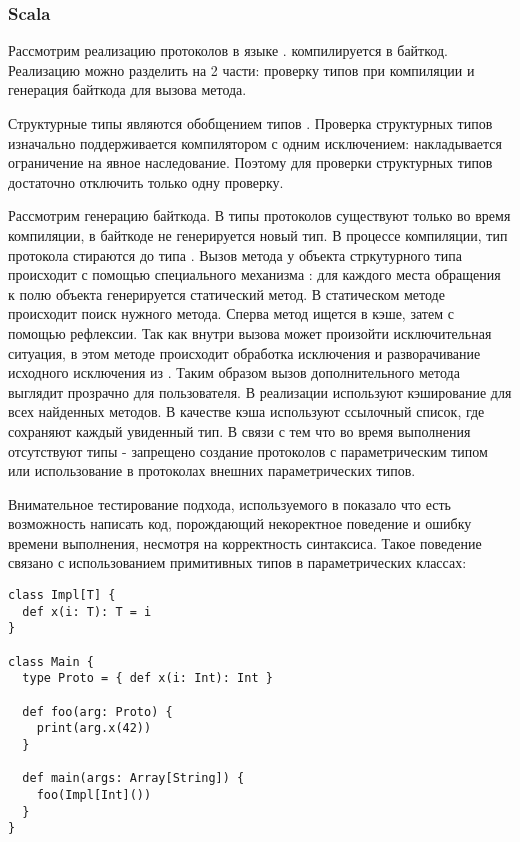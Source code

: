 \subsubsection{Scala}
Рассмотрим реализацию протоколов в языке \cite{scala:structural}.  компилируется в  байткод. Реализацию можно разделить на 2 части: проверку типов при компиляции и генерация байткода для вызова метода.

Структурные типы являются обобщением типов . Проверка структурных типов изначально поддерживается компилятором с одним исключением: накладывается ограничение на явное наследование. Поэтому для проверки структурных типов достаточно отключить только одну проверку.

Рассмотрим генерацию байткода. В  типы протоколов существуют только во время компиляции, в байткоде не генерируется новый тип. В процессе компиляции, тип протокола стираются до типа . Вызов метода у объекта стркутурного типа происходит с помощью специального механизма : для каждого места обращения к полю объекта генерируется статический метод. В статическом методе происходит поиск нужного метода. Сперва метод ищется в кэше, затем с помощью рефлексии. Так как внутри вызова может произойти исключительная ситуация, в этом методе происходит обработка исключения и разворачивание исходного исключения из . Таким образом вызов дополнительного метода выглядит прозрачно для пользователя. В реализации используют кэширование для всех найденных методов. В качестве кэша используют ссылочный список, где сохраняют каждый увиденный тип. В связи с тем что во время выполнения отсутствуют типы - запрещено создание протоколов с параметрическим типом или использование в протоколах внешних параметрических типов.

Внимательное тестирование подхода, используемого в  показало что есть возможность написать код, порождающий некоректное поведение и ошибку времени выполнения, несмотря на корректность синтаксиса. Такое поведение связано с использованием примитивных типов в параметрических классах:

\begin{verbatim}
class Impl[T] {
  def x(i: T): T = i
}

class Main {
  type Proto = { def x(i: Int): Int }

  def foo(arg: Proto) {
    print(arg.x(42))
  }

  def main(args: Array[String]) {
    foo(Impl[Int]())
  }
}
\end{verbatim}

